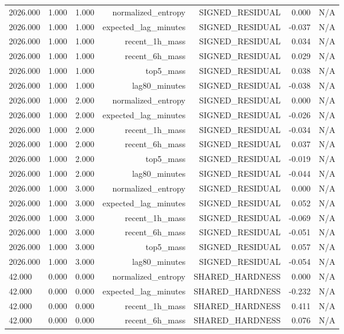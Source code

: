 \begin{table}[h!]
\begin{tabular}{lrrrrrr}
2026.000 & 1.000 & 1.000 & normalized\_entropy & SIGNED\_RESIDUAL & 0.000 & N/A \\
2026.000 & 1.000 & 1.000 & expected\_lag\_minutes & SIGNED\_RESIDUAL & -0.037 & N/A \\
2026.000 & 1.000 & 1.000 & recent\_1h\_mass & SIGNED\_RESIDUAL & 0.034 & N/A \\
2026.000 & 1.000 & 1.000 & recent\_6h\_mass & SIGNED\_RESIDUAL & 0.029 & N/A \\
2026.000 & 1.000 & 1.000 & top5\_mass & SIGNED\_RESIDUAL & 0.038 & N/A \\
2026.000 & 1.000 & 1.000 & lag80\_minutes & SIGNED\_RESIDUAL & -0.038 & N/A \\
2026.000 & 1.000 & 2.000 & normalized\_entropy & SIGNED\_RESIDUAL & 0.000 & N/A \\
2026.000 & 1.000 & 2.000 & expected\_lag\_minutes & SIGNED\_RESIDUAL & -0.026 & N/A \\
2026.000 & 1.000 & 2.000 & recent\_1h\_mass & SIGNED\_RESIDUAL & -0.034 & N/A \\
2026.000 & 1.000 & 2.000 & recent\_6h\_mass & SIGNED\_RESIDUAL & 0.037 & N/A \\
2026.000 & 1.000 & 2.000 & top5\_mass & SIGNED\_RESIDUAL & -0.019 & N/A \\
2026.000 & 1.000 & 2.000 & lag80\_minutes & SIGNED\_RESIDUAL & -0.044 & N/A \\
2026.000 & 1.000 & 3.000 & normalized\_entropy & SIGNED\_RESIDUAL & 0.000 & N/A \\
2026.000 & 1.000 & 3.000 & expected\_lag\_minutes & SIGNED\_RESIDUAL & 0.052 & N/A \\
2026.000 & 1.000 & 3.000 & recent\_1h\_mass & SIGNED\_RESIDUAL & -0.069 & N/A \\
2026.000 & 1.000 & 3.000 & recent\_6h\_mass & SIGNED\_RESIDUAL & -0.051 & N/A \\
2026.000 & 1.000 & 3.000 & top5\_mass & SIGNED\_RESIDUAL & 0.057 & N/A \\
2026.000 & 1.000 & 3.000 & lag80\_minutes & SIGNED\_RESIDUAL & -0.054 & N/A \\
42.000 & 0.000 & 0.000 & normalized\_entropy & SHARED\_HARDNESS & 0.000 & N/A \\
42.000 & 0.000 & 0.000 & expected\_lag\_minutes & SHARED\_HARDNESS & -0.232 & N/A \\
42.000 & 0.000 & 0.000 & recent\_1h\_mass & SHARED\_HARDNESS & 0.411 & N/A \\
42.000 & 0.000 & 0.000 & recent\_6h\_mass & SHARED\_HARDNESS & 0.076 & N/A \\

\end{tabular}
\end{table}
